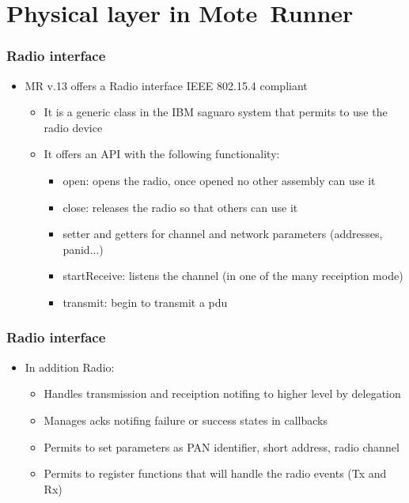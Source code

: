 \section{Physical layer in \mbox{Mote Runner}}
\begin{frame}[fragile]
  \frametitle{Radio interface}
  \begin{itemize}
    \item MR v.13 offers a Radio interface IEEE 802.15.4 compliant
    \begin{itemize}
    	\item It is a generic class in the IBM saguaro system that permits to use the radio device
    	\item It offers an API with the following functionality:
    	\begin{itemize}
			\item open: opens the radio, once opened no other assembly can use it
			\item close: releases the radio so that others can use it
			\item setter and getters for channel and network parameters (addresses, panid...)
			\item startReceive: listens the channel (in one of the many receiption mode)
			\item transmit: begin to transmit a pdu
    	\end{itemize}
    \end{itemize}
  \end{itemize}
\end{frame}

\begin{frame}[fragile]
	\frametitle{Radio interface}
	\begin{itemize}
		\item In addition Radio:
		\begin{itemize}
			\item Handles transmission and receiption notifing to higher level by delegation
			\item Manages acks notifing failure or success states in callbacks
			\item Permits to set parameters as PAN identifier, short address, radio channel
			\item Permits to register functions that will handle the radio events (Tx and Rx)
		\end{itemize}
	\end{itemize}
\end{frame}


